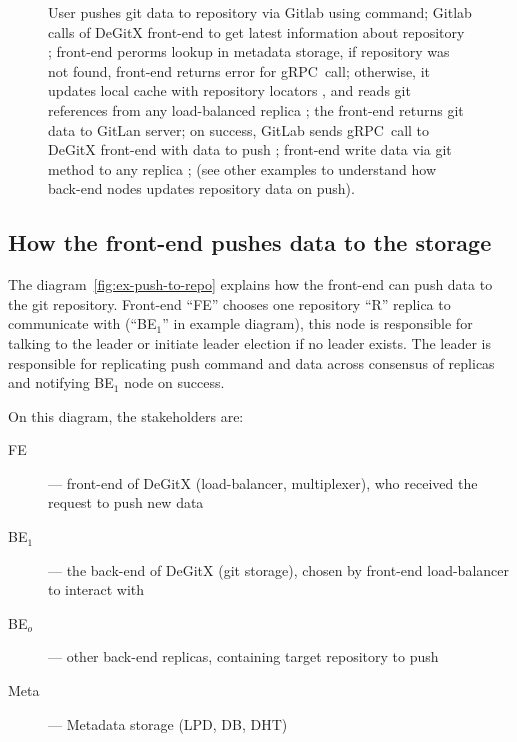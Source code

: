 \begin{figure}
\caption{%
  User pushes git data to repository  via Gitlab using  command;%
  Gitlab calls  of DeGitX front-end to get latest information%
  about repository ; front-end perorms lookup in metadata storage,%
  if repository was not found, front-end returns error for gRPC~call;%
  otherwise, it updates local cache with repository locators , and reads git references from%
  any load-balanced replica ; the front-end returns git data to GitLan server;%
  on success, GitLab sends  gRPC~call to DeGitX front-end with data to push ;%
  front-end write data via  git method to any replica ;%
  (see other examples to understand how back-end nodes updates repository data on push).%
}\label{fig:gitlab-push-gitaly}
\end{figure}

\subsection{How the front-end pushes data to the storage}

The diagram~\ref{fig:ex-push-to-repo} explains how the front-end can push data to the git repository.
Front-end ``FE'' chooses one repository ``R'' replica to communicate with (``BE$_{1}$'' in example diagram),
this node is responsible for talking to the leader or initiate leader election if no leader exists.
The leader is responsible for replicating push command and data across consensus of replicas
and notifying BE$_{1}$ node on success.

On this diagram, the stakeholders are:
\begin{description}
  \item[FE] --- front-end of DeGitX (load-balancer, multiplexer), who received the request to push new data
  \item[BE$_{1}$] --- the back-end of DeGitX (git storage), chosen by front-end load-balancer to interact with
  \item[BE$_{o}$] --- other back-end replicas, containing target repository to push
  \item[Meta] --- Metadata storage (LPD, DB, DHT)
\end{description}

